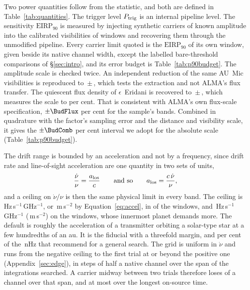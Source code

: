 Two power quantities follow from the statistic, and both are defined in
Table~\ref{tab:quantities}. The trigger level $P_{\rm trig}$ is an internal
pipeline level. The sensitivity $\mathrm{EIRP}_{90}$ is measured by injecting
synthetic carriers of known amplitude into the calibrated visibilities of
\SensNInj{} windows and recovering them through the unmodified pipeline.
Every carrier limit quoted is the $\mathrm{EIRP}_{90}$ of its own window,
given beside its native channel width, except the labelled bare-threshold
comparisons of \S\ref{sec:intro}, and its error budget is
Table~\ref{tab:p90budget}. The
amplitude scale is checked twice. An independent reduction of the same
AU~Mic visibilities is reproduced to \PxJanRatio\,$\pm$\,\PxJanRatioErr,
which tests the extraction and not ALMA's flux transfer. The quiescent flux
density of $\epsilon$~Eridani \citep{Burton2022} is recovered to
\PxEpsRatio\,$\pm$\,\PxEpsRatioErr, which measures the scale to \SbEpsPct{}
per cent. That is consistent with ALMA's own flux-scale specification,
$\pm\BudFlux$ per cent for the sample's bands. Combined in quadrature
with the factor's sampling error and the distance and visibility scale, it
gives the $\pm\BudComb$ per cent interval we adopt
for the absolute scale (Table~\ref{tab:p90budget}).

The drift range is bounded by an acceleration and not by a frequency, since
drift rate and line-of-sight acceleration are one quantity in two sets of
units,
%
\begin{equation}
\frac{\dot\nu}{\nu}=\frac{a_{\rm los}}{c}
\qquad\text{and so}\qquad
a_{\rm los}=\frac{c\,\dot\nu}{\nu},
\label{eq:accel}
\end{equation}
%
and a ceiling on $\dot\nu/\nu$ is then the same physical limit in every band.
The ceiling is \DriftCeilLo\,Hz\,s$^{-1}$\,GHz$^{-1}$, or
\AccelCeilMed\,m\,s$^{-2}$ by Equation~\ref{eq:accel}, in \AccelNDefault{} of
the \NWinA{} windows, and \DriftCeilHi\,Hz\,s$^{-1}$\,GHz$^{-1}$
(\AccelCeilMax\,m\,s$^{-2}$) on the \AccelNWide{} \AccelWideStar{} windows,
whose innermost planet demands more. The default is roughly the acceleration
of a transmitter orbiting a solar-type star at a few hundredths of an au. It
is the \citet{Mason2025} fiducial with a threefold margin, and
\AccelSheikhPct{} per cent of the \AccelSheikhNHz\,nHz that
\citet{Sheikh2019} recommend for a general search. The grid is uniform in
$\dot\nu$ and runs from the negative ceiling to the first trial at or beyond
the positive one (Appendix~\ref{sec:edge}), in steps of half a native channel
over the span of the integrations searched. A carrier midway between two
trials therefore loses \DriftGridSpanHalf{} of a channel over that span, and
at most \DriftGridFineHalf{} over the longest on-source time.

